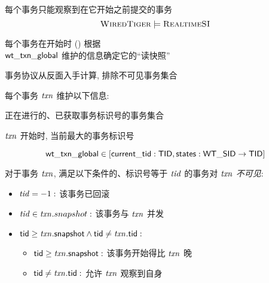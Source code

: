 \begin{frame}{}
  \begin{center}
	每个事务只能观察到在它开始之前提交的事务
	\[
	  \textsc{WiredTiger} \models \textsc{RealtimeSI}
	\]

	\pause
	\vspace{0.30cm}
	每个事务在开始时 (\wtstart) 根据 \\[5pt]
	${\sf wt\_txn\_global}$ 维护的信息确定它的``读快照''

	\vspace{0.60cm}
	\wtalg{} 事务协议从反面入手计算, 排除不可见事务集合
  \end{center}
\end{frame}

\begin{frame}{}
  \begin{center}
	每个事务 $\mathit{txn}$ 维护以下信息:
  \end{center}
  \begin{description}
	\setlength{\itemsep}{5pt}
	\item[$\txnvar.\snapshot:$] 正在进行的、已获取事务标识号的事务集合
	\item[$\txnvar.\snapmax:$] $\mathit{txn}$ 开始时, 当前最大的事务标识号
  \end{description}

  \[
	{\sf wt\_txn\_global} \in [{\sf current\_tid} : {\sf TID}, {\sf states} : {\sf WT\_SID} \to {\sf TID}]
  \]
\end{frame}

\begin{frame}{}
  

  \begin{center}
	对于事务 $\mathit{txn}$, 满足以下条件的、标识号等于 $\mathit{tid}$ 的事务对 $\mathit{txn}$ \emph{不可见}:
  \end{center}
  \begin{itemize}
	\setlength{\itemsep}{10pt}
	\item $\mathit{tid} = -1:$ 该事务已回滚
	\item $\mathit{tid} \in \mathit{txn}.snapshot:$ 该事务与 $\mathit{txn}$ 并发
	\item ${\sf tid} \ge \mathit{txn}.{\sf snapshot} \land {\sf tid} \neq \mathit{txn}.{\sf tid}:$
	  \vspace{0.20cm}
	  \begin{itemize}
		\setlength{\itemsep}{5pt}
		\item ${\sf tid} \ge \mathit{txn}.{\sf snapshot}:$ 该事务开始得比 $\mathit{txn}$ 晚
		\item ${\sf tid} \neq \mathit{txn}.{\sf tid}:$ 允许 $\mathit{txn}$ 观察到自身
	  \end{itemize}
  \end{itemize}
\end{frame}

